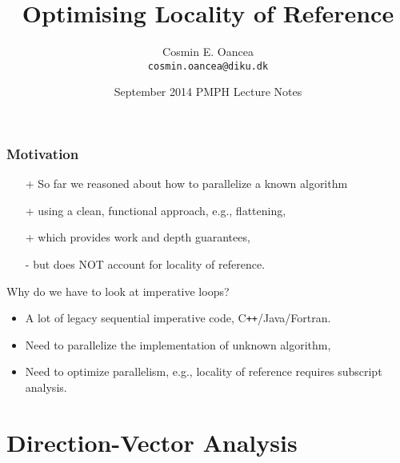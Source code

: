 \documentclass{beamer}
\title[Locality]{Optimising Locality of Reference}
\author[C.~Oancea]{Cosmin E. Oancea\\{\tt cosmin.oancea@diku.dk}}
\institute{Department of Computer Science (DIKU)\\University of Copenhagen}
\date[Sept 2014]{September 2014 PMPH Lecture Notes}
\newcommand{\emp}[1]{\textcolor{DikuRed}{ #1}}
\begin{document}
\titleslide




\begin{frame}
  \frametitle{Motivation}

\begin{itemize}
    \item[+] So far we reasoned about how to parallelize a known algorithm
    \item[+] using a clean, functional approach, e.g., flattening, 
    \item[+] which provides work and depth guarantees,
    \item[\alert{-}] but does \alert{NOT} account for locality of reference.

\end  {itemize}\bigskip

\emp{Why do we have to look at imperative loops?}
\begin{itemize}    
    \item A lot of legacy sequential imperative code, C{\tt++}/Java/Fortran.\medskip
    \item Need to parallelize the implementation of unknown algorithm,\medskip
    \item Need to optimize parallelism, e.g., locality of reference requires subscript analysis. 
\end  {itemize}  

\end{frame}


\section{Direction-Vector Analysis}

\begin{frame}[fragile]
	\tableofcontents[currentsection]
\end{frame}
\end{document}
